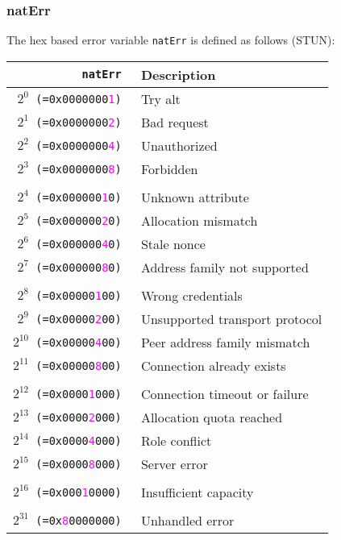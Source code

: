 \documentclass[documentation]{subfiles}
\begin{document}
\subsubsection{natErr}\label{natErr}
The hex based error variable {\tt natErr} is defined as follows (STUN):
\begin{longtable}{>{\tt}rl}
    \toprule
    {\bf natErr} & {\bf Description} \\
    \midrule\endhead%
    $2^{0}$  (=0x0000000\textcolor{magenta}{1}) & Try alt\\
    $2^{1}$  (=0x0000000\textcolor{magenta}{2}) & Bad request\\
    $2^{2}$  (=0x0000000\textcolor{magenta}{4}) & Unauthorized\\
    $2^{3}$  (=0x0000000\textcolor{magenta}{8}) & Forbidden\\
    \\
    $2^{4}$  (=0x000000\textcolor{magenta}{1}0) & Unknown attribute\\
    $2^{5}$  (=0x000000\textcolor{magenta}{2}0) & Allocation mismatch\\
    $2^{6}$  (=0x000000\textcolor{magenta}{4}0) & Stale nonce\\
    $2^{7}$  (=0x000000\textcolor{magenta}{8}0) & Address family not supported\\
    \\
    $2^{8}$  (=0x00000\textcolor{magenta}{1}00) & Wrong credentials\\
    $2^{9}$  (=0x00000\textcolor{magenta}{2}00) & Unsupported transport protocol\\
    $2^{10}$ (=0x00000\textcolor{magenta}{4}00) & Peer address family mismatch\\
    $2^{11}$ (=0x00000\textcolor{magenta}{8}00) & Connection already exists\\
    \\
    $2^{12}$ (=0x0000\textcolor{magenta}{1}000) & Connection timeout or failure\\
    $2^{13}$ (=0x0000\textcolor{magenta}{2}000) & Allocation quota reached\\
    $2^{14}$ (=0x0000\textcolor{magenta}{4}000) & Role conflict\\
    $2^{15}$ (=0x0000\textcolor{magenta}{8}000) & Server error\\
    \\
    $2^{16}$ (=0x000\textcolor{magenta}{1}0000) & Insufficient capacity\\
    \\
    $2^{31}$ (=0x\textcolor{magenta}{8}0000000) & Unhandled error\\
    \bottomrule
\end{longtable}
\end{document}
